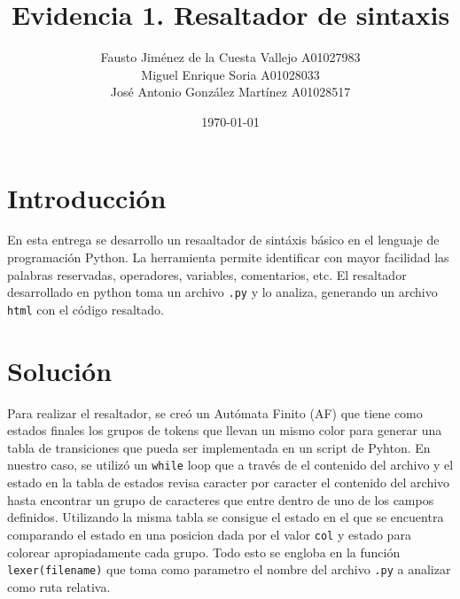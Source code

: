 \documentclass{article}
\title{Evidencia 1. Resaltador de sintaxis}
\author{Fausto Jiménez de la Cuesta Vallejo A01027983\\
        Miguel Enrique Soria A01028033\\
        José Antonio González Martínez A01028517}
\date{\today}
\begin{document}
\maketitle

\section{Introducción}
En esta entrega se desarrollo un resaaltador de sintáxis básico en el lenguaje 
de programación Python. La herramienta permite identificar con mayor facilidad 
las palabras reservadas, operadores, variables, comentarios, etc. El 
resaltador desarrollado en python toma un archivo \texttt{.py} y lo analiza, 
generando un archivo \texttt{html} con el código resaltado.

\section{Solución}
Para realizar el resaltador, se creó un Autómata Finito (AF) que tiene como 
estados finales los grupos de tokens que llevan un mismo color para generar 
una tabla de transiciones que pueda ser implementada en un script de Pyhton. 
En nuestro caso, se utilizó un \texttt{while} loop que a través de el 
contenido del archivo y el estado en la tabla de estados revisa caracter por 
caracter el contenido del archivo hasta encontrar un grupo de caracteres que 
entre dentro de uno de los campos definidos. Utilizando la misma tabla se 
consigue el estado en el que se encuentra comparando el estado en una posicion 
dada por el valor \texttt{col} y estado para colorear apropiadamente cada 
grupo. Todo esto se engloba en la función \texttt{lexer(filename)} que toma 
como parametro el nombre del archivo \texttt{.py} a analizar como ruta relativa.
\end{document}
